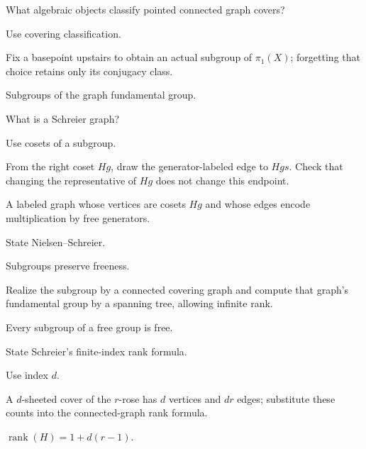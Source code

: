 \begin{exercise}\label{exr:viii14-17}
What algebraic objects classify pointed connected graph covers?
\end{exercise}
\begin{hint}
Use covering classification.

Fix a basepoint upstairs to obtain an actual subgroup of \(\pi_1(X)\); forgetting that choice retains only its conjugacy class.
\end{hint}
\begin{solution}
Subgroups of the graph fundamental group.
\end{solution}

\begin{exercise}\label{exr:viii14-18}
What is a Schreier graph?
\end{exercise}
\begin{hint}
Use cosets of a subgroup.

From the right coset \(Hg\), draw the generator-labeled edge to \(Hgs\). Check that changing the representative of \(Hg\) does not change this endpoint.
\end{hint}
\begin{solution}
A labeled graph whose vertices are cosets \(Hg\) and whose edges encode multiplication by free generators.
\end{solution}

\begin{exercise}\label{exr:viii14-19}
State Nielsen--Schreier.
\end{exercise}
\begin{hint}
Subgroups preserve freeness.

Realize the subgroup by a connected covering graph and compute that graph's fundamental group by a spanning tree, allowing infinite rank.
\end{hint}
\begin{solution}
Every subgroup of a free group is free.
\end{solution}

\begin{exercise}\label{exr:viii14-20}
State Schreier's finite-index rank formula.
\end{exercise}
\begin{hint}
Use index \(d\).

A \(d\)-sheeted cover of the \(r\)-rose has \(d\) vertices and \(dr\) edges; substitute these counts into the connected-graph rank formula.
\end{hint}
\begin{solution}
\(\operatorname{rank}(H)=1+d(r-1)\).
\end{solution}

